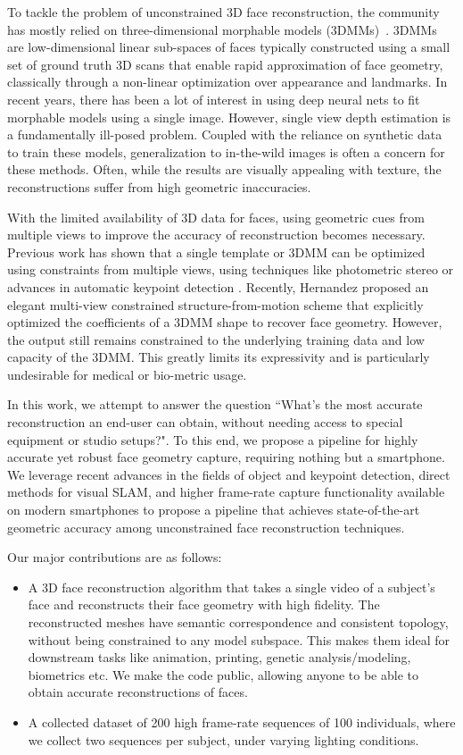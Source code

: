 \documentclass[10pt,twocolumn,letterpaper]{article}
\begin{document}
To tackle the problem of unconstrained 3D face reconstruction, the community has mostly relied on three-dimensional morphable models (3DMMs)~\cite{blanz1999morphable}. 3DMMs are low-dimensional linear sub-spaces of faces typically constructed using a small set of ground truth 3D scans that enable rapid approximation of face geometry, classically through a non-linear optimization over appearance and landmarks. In recent years, there has been a lot of interest in using deep neural nets to fit morphable models using a single image. However, single view depth estimation is a fundamentally ill-posed problem. Coupled with the reliance on synthetic data to train these models, generalization to in-the-wild images is often a concern for these methods. Often, while the results are visually appealing with texture, the reconstructions suffer from high geometric inaccuracies.

With the limited availability of 3D data for faces, using geometric cues from multiple views to improve the accuracy of reconstruction becomes necessary. Previous work has shown that a single template or 3DMM can be optimized using constraints from multiple views, using techniques like photometric stereo \cite{roth2015unconstrained} or advances in automatic keypoint detection \cite{huber2016multiresolution}.
Recently, Hernandez \etal \cite{hernandez2017accurate} proposed an elegant multi-view constrained structure-from-motion scheme that explicitly optimized the coefficients of a 3DMM shape to recover face geometry. However, the output still remains constrained to the underlying training data and low capacity of the 3DMM. This greatly limits its expressivity and is particularly undesirable for medical or bio-metric usage. 


In this work, we attempt to answer the question ``What's the most accurate reconstruction an end-user can obtain, without needing access to special equipment or studio setups?". To this end, we propose a pipeline for highly accurate yet robust face geometry capture, requiring nothing but a smartphone. We leverage recent advances in the fields of object and keypoint detection, direct methods for visual SLAM, and higher frame-rate capture functionality available on modern smartphones to propose a pipeline that achieves state-of-the-art geometric accuracy among unconstrained face reconstruction techniques.

Our major contributions are as follows:
 \begin{itemize}
     \item  A 3D face reconstruction algorithm that takes a single video of a subject's face and reconstructs their face geometry with high fidelity. The reconstructed meshes have semantic correspondence and consistent topology, without being constrained to any model subspace. This makes them ideal for downstream tasks like animation, printing, genetic analysis/modeling, biometrics etc. We make the code public, allowing anyone to be able to obtain accurate reconstructions of faces.
     \item A collected dataset of 200 high frame-rate  sequences of 100 individuals, where we collect two sequences per subject, under varying lighting conditions.
 \end{itemize}
\end{document}
